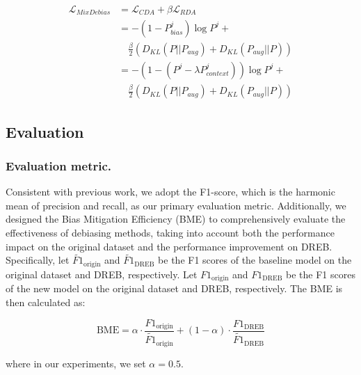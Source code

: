 \documentclass[letterpaper]{article} %
\begin{document}
\begin{equation}
    \begin{aligned}
        \mathcal{L}_{MixDebias} &= \mathcal{L}_{CDA} + \beta \mathcal{L}_{RDA} \\
        &= -(1 - P_{bias}^j) \log P^j + \\
        & \quad \frac{\beta}{2} (D_{KL} (P || P_{aug}) + D_{KL} (P_{aug} || P)) \\
        &= - (1 - (P^j - \lambda P_{context}^j)) \log P^j + \\
        & \quad \frac{\beta}{2} (D_{KL} (P || P_{aug}) + D_{KL} (P_{aug} || P))
    \end{aligned}
\end{equation}

\subsection{Evaluation}

\subsubsection{Evaluation metric.}
Consistent with previous work, we adopt the F1-score, which is the harmonic mean of precision and recall, as our primary evaluation metric. Additionally, we designed the Bias Mitigation Efficiency (BME) to comprehensively evaluate the effectiveness of debiasing methods, taking into account both the performance impact on the original dataset and the performance improvement on DREB. Specifically, let $\widetilde{F1}_{\text{origin}}$ and \( \widetilde{F1}_{\text{DREB}} \) be the F1 scores of the baseline model on the original dataset and DREB, respectively. Let \( F1_{\text{origin}} \) and \( F1_{\text{DREB}} \) be the F1 scores of the new model on the original dataset and DREB, respectively. The BME is then calculated as:

\begin{equation}
    \text{BME} = \alpha \cdot \frac{F1_{\text{origin}}}{\widetilde{F1}_{\text{origin}}} + (1 - \alpha) \cdot \frac{F1_{\text{DREB}}}{\widetilde{F1}_{\text{DREB}}}
\end{equation}

\noindent where in our experiments, we set \( \alpha = 0.5 \).
\end{document}
